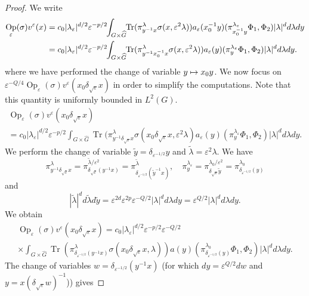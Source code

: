 \documentclass[10pt]{amsart}
\newcommand\mto{\mathchoice{\longmapsto}{\mapsto}{\mapsto}{\mapsto}}
\DeclareMathOperator{\Op}{Op}
\DeclareMathOperator{\Tr}{Tr}
\theoremstyle{plain}
\theoremstyle{definition}
\let\eps\varepsilon
\begin{document}
\begin{proof}
We write
\begin{align*}
\Op_\eps(\sigma) v^\eps(x) &=c_0|\lambda_\eps|^{d/2} \eps^{-p/2}
\hspace*{-1mm}\int_{G\times \widehat G}\hspace*{-1mm} \Tr (\pi^\lambda_{y^{-1} x}\sigma(x,\eps^2\lambda))
a_\eps(x_0^{-1}y) (\pi_{x_0^{-1}y}^{\lambda_\eps} \Phi_1,\Phi_2) |\lambda|^d d\lambda dy\\
&= c_0|\lambda_\eps|^{d/2} \eps^{-p/2}
\hspace*{-1mm}\int_{G\times \widehat G}\hspace*{-1mm} \Tr (\pi^\lambda_{y^{-1} x_0^{-1} x}\sigma(x,\eps^2\lambda))
a_\eps(y) (\pi_{y}^{\lambda_\eps} \Phi_1,\Phi_2) |\lambda|^d d\lambda dy.
\end{align*}
where we have performed the change of variable $y\mto x_0y$. We now focus on $\eps^{-Q/4}\Op_\eps(\sigma) v^\eps(x_0\delta_{\sqrt\eps} x)$ in order to simplify the computations. Note that this quantity is uniformly bounded in $L^2(G)$.
\begin{multline*}
\Op_\eps(\sigma) v^\eps(x_0\delta_{\sqrt\eps}x)\\
= c_0 |\lambda_\eps|^{d/2}\eps^{-p/2}
\int_{G\times \widehat G} \Tr (\pi^\lambda_{y^{-1} \delta_{\sqrt\eps} x}\sigma(x_0 \delta_{\sqrt\eps} x,\eps^2\lambda)
a_\eps(y) (\pi_{y}^{\lambda_\eps} \Phi_1,\Phi_2) |\lambda|^d d\lambda dy.
\end{multline*}
We perform the change of variable $\widetilde y = \delta_{\eps^{-1/2}} y$ and $\widetilde\lambda= \eps^2 \lambda$.
We have
\[
\pi^{\lambda} _{y^{-1} \delta_{\sqrt\eps} x}= \pi^{\widetilde \lambda/\eps^2}_{\delta_{\sqrt\eps}(y^{-1} x)}=
\pi^{\widetilde\lambda}_{\delta_{\eps^{-1/2}} (\widetilde y ^{-1}x)},
\quad
\pi^{\lambda_\eps}_y= \pi^{\lambda_0/\eps^2}_{ \delta _{\sqrt\eps}\widetilde y} = \pi^{\lambda_0} _{ \delta_{\eps^{-1/2}} (y)}
\]
and
\[
|\widetilde\lambda|^d d\widetilde \lambda d\widetilde y = \eps^{2d}\eps^{2p} \eps^{-Q/2} |\lambda|^d d\lambda dy= \eps^{Q/2} |\lambda|^dd\lambda dy.
\]
We obtain
\begin{multline*}
\Op_\eps(\sigma) v^\eps(x_0\delta_{\sqrt\eps} x) = c_0|\lambda_\eps|^{d/2}\eps^{-p/2}\eps^{-Q/2} \\
\times \int_{G\times \widehat G} \Tr (\pi^{\lambda}_{ \delta_{\eps^{-1/2}} (y^{-1} x)}\sigma(x_0\delta_{\sqrt\eps} x,\lambda))
a(y) (\pi_{\delta_{\eps^{-1/2}}(y)}^{\lambda_0} \Phi_1,\Phi_2) |\lambda|^d d\lambda dy.
\end{multline*}
The change of variables $w\!=\!\delta_{\eps^{-1/2}} (y^{-1} x)$ (for which $dy\!=\! \eps^{Q/2} dw$ and $y\!=\!x(\delta_{\sqrt\eps }w)^{-1}$)) gives

\end{proof}
\end{document}
